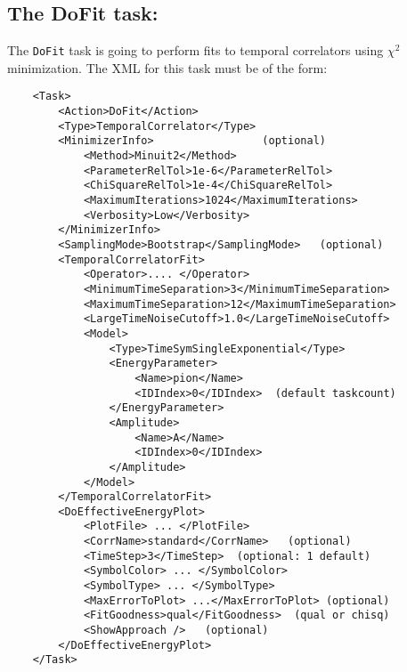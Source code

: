 \documentclass[12pt]{article}
\newcommand{\vb}{\texttt}
\begin{document}
\subsection{The DoFit task:}
The \vb{DoFit} task is going to perform fits to temporal correlators
using $\chi^2$ minimization.
The XML for this task must be of the form:
\begin{verbatim}
    <Task>
        <Action>DoFit</Action>
        <Type>TemporalCorrelator</Type>
        <MinimizerInfo>                 (optional)
            <Method>Minuit2</Method>
            <ParameterRelTol>1e-6</ParameterRelTol>
            <ChiSquareRelTol>1e-4</ChiSquareRelTol>
            <MaximumIterations>1024</MaximumIterations>
            <Verbosity>Low</Verbosity>
        </MinimizerInfo>
        <SamplingMode>Bootstrap</SamplingMode>   (optional)
        <TemporalCorrelatorFit>
            <Operator>.... </Operator>
            <MinimumTimeSeparation>3</MinimumTimeSeparation>
            <MaximumTimeSeparation>12</MaximumTimeSeparation>
            <LargeTimeNoiseCutoff>1.0</LargeTimeNoiseCutoff>
            <Model>
                <Type>TimeSymSingleExponential</Type>
                <EnergyParameter>
                    <Name>pion</Name>
                    <IDIndex>0</IDIndex>  (default taskcount)
                </EnergyParameter>
                <Amplitude>
                    <Name>A</Name>
                    <IDIndex>0</IDIndex>
                </Amplitude>
            </Model>
        </TemporalCorrelatorFit>
        <DoEffectiveEnergyPlot>
            <PlotFile> ... </PlotFile>
            <CorrName>standard</CorrName>   (optional)
            <TimeStep>3</TimeStep>  (optional: 1 default)
            <SymbolColor> ... </SymbolColor>
            <SymbolType> ... </SymbolType>
            <MaxErrorToPlot> ...</MaxErrorToPlot> (optional)
            <FitGoodness>qual</FitGoodness>  (qual or chisq)
            <ShowApproach />   (optional)
        </DoEffectiveEnergyPlot>
    </Task>
\end{verbatim}
\end{document}
